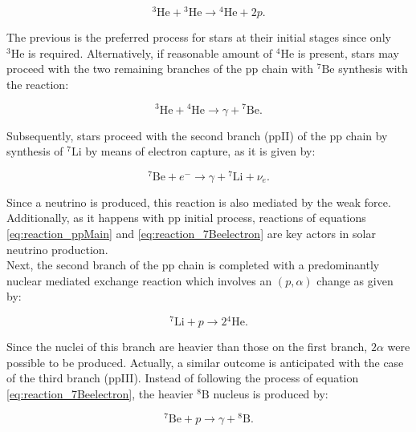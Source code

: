 \documentclass[openany]{book}
\begin{document}
\begin{equation} \label{eq:reaction_3Hep3He}
	 {}^{3} \mathrm{He} +  {}^{3} \mathrm{He} \rightarrow {}^{4}\mathrm{He} + 2p.
\end{equation}

The previous is the preferred process for stars at their initial stages since only $ {}^{3} \mathrm{He} $ is required. Alternatively, if reasonable amount of ${}^{4}\mathrm{He}$ is present, stars may proceed with the two remaining branches of the pp chain with $\mathrm{{}^{7}Be}$ synthesis with the reaction: 

\begin{equation}  \label{eq:reaction_3He4He}
	{}^{3}\mathrm{He} +{}^{4}\mathrm{He} \rightarrow \gamma +  \mathrm{{}^{7}Be} .
\end{equation}

Subsequently, stars proceed with the second branch (ppII)  of the pp chain by synthesis of $\mathrm{{}^{7}Li}$ by means of electron capture, as it is given by:

\begin{equation}  \label{eq:reaction_7Beelectron}
	{}^{7}\mathrm{Be} + e^{-} \rightarrow \gamma +  \mathrm{{}^{7}Li} + \nu_e.
\end{equation}

Since a neutrino is produced, this reaction is also mediated by the weak force. Additionally, as it happens with pp initial process, reactions of equations \ref{eq:reaction_ppMain} and \ref{eq:reaction_7Beelectron} are key actors in solar neutrino production.  \\

Next, the second branch of the pp chain is completed with a predominantly nuclear mediated exchange reaction which involves an $(p, \alpha)$ change as given by: 

\begin{equation}  \label{eq:reaction_7Lialpha}
	{}^{7}\mathrm{Li} + p  \rightarrow 2\mathrm{{}^{4}He}.
\end{equation}

Since the nuclei of this branch are heavier than those on the first branch, $2\alpha$ were possible to be produced. Actually, a similar outcome is anticipated with the case of the third branch  (ppIII). Instead of following the process of equation \ref{eq:reaction_7Beelectron}, the heavier $\mathrm{{}^{8}B}$ nucleus is produced by:

\begin{equation}  \label{eq:reaction_7Bep}
		{}^{7}\mathrm{Be}  + p \rightarrow \gamma +  \mathrm{{}^{8}B} .
\end{equation}
\end{document}

